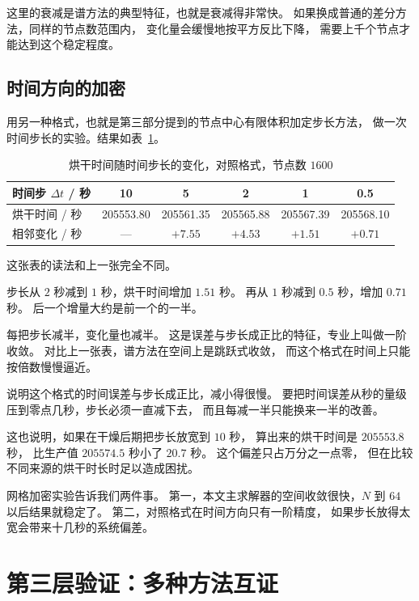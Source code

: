 这里的衰减是谱方法的典型特征，也就是衰减得非常快。
如果换成普通的差分方法，同样的节点数范围内，
变化量会缓慢地按平方反比下降，
需要上千个节点才能达到这个稳定程度。

\subsection{时间方向的加密}

用另一种格式，也就是第三部分提到的节点中心有限体积加定步长方法，
做一次时间步长的实验。结果如表~\ref{tab:verify3}。

\begin{table}[H]
\centering
\small
\caption{烘干时间随时间步长的变化，对照格式，节点数 $1600$}
\label{tab:verify3}
\begin{tabular}{@{}lccccc@{}}
\toprule
时间步 $\Delta t$ / 秒 & 10 & 5 & 2 & 1 & 0.5 \\
\midrule
烘干时间 / 秒 & 205553.80 & 205561.35 & 205565.88 & 205567.39 & 205568.10 \\
相邻变化 / 秒 & --- & $+7.55$ & $+4.53$ & $+1.51$ & $+0.71$ \\
\bottomrule
\end{tabular}
\end{table}

这张表的读法和上一张完全不同。

步长从 $2$ 秒减到 $1$ 秒，烘干时间增加 $1.51$ 秒。
再从 $1$ 秒减到 $0.5$ 秒，增加 $0.71$ 秒。
后一个增量大约是前一个的一半。

每把步长减半，变化量也减半。
这是误差与步长成正比的特征，专业上叫做一阶收敛。
对比上一张表，谱方法在空间上是跳跃式收敛，
而这个格式在时间上只能按倍数慢慢逼近。

说明这个格式的时间误差与步长成正比，减小得很慢。
要把时间误差从秒的量级压到零点几秒，步长必须一直减下去，
而且每减一半只能换来一半的改善。

这也说明，如果在干燥后期把步长放宽到 $10$ 秒，
算出来的烘干时间是 $205553.8$ 秒，
比生产值 $205574.5$ 秒小了 $20.7$ 秒。
这个偏差只占万分之一点零，
但在比较不同来源的烘干时长时足以造成困扰。

\keypoint
网格加密实验告诉我们两件事。
第一，本文主求解器的空间收敛很快，$N$ 到 $64$ 以后结果就稳定了。
第二，对照格式在时间方向只有一阶精度，
如果步长放得太宽会带来十几秒的系统偏差。

\section{第三层验证：多种方法互证}

